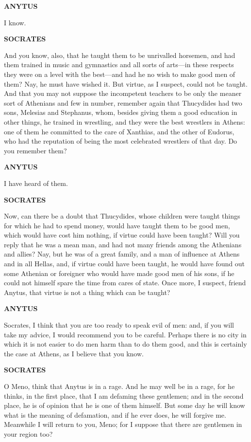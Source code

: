 \documentclass[11pt,letter]{article}
\begin{document}
\par \textbf{ANYTUS}
\par   I know.

\par \textbf{SOCRATES}
\par   And you know, also, that he taught them to be unrivalled horsemen, and had them trained in music and gymnastics and all sorts of arts—in these respects they were on a level with the best—and had he no wish to make good men of them? Nay, he must have wished it. But virtue, as I suspect, could not be taught. And that you may not suppose the incompetent teachers to be only the meaner sort of Athenians and few in number, remember again that Thucydides had two sons, Melesias and Stephanus, whom, besides giving them a good education in other things, he trained in wrestling, and they were the best wrestlers in Athens:  one of them he committed to the care of Xanthias, and the other of Eudorus, who had the reputation of being the most celebrated wrestlers of that day. Do you remember them?

\par \textbf{ANYTUS}
\par   I have heard of them.

\par \textbf{SOCRATES}
\par   Now, can there be a doubt that Thucydides, whose children were taught things for which he had to spend money, would have taught them to be good men, which would have cost him nothing, if virtue could have been taught? Will you reply that he was a mean man, and had not many friends among the Athenians and allies? Nay, but he was of a great family, and a man of influence at Athens and in all Hellas, and, if virtue could have been taught, he would have found out some Athenian or foreigner who would have made good men of his sons, if he could not himself spare the time from cares of state. Once more, I suspect, friend Anytus, that virtue is not a thing which can be taught?

\par \textbf{ANYTUS}
\par   Socrates, I think that you are too ready to speak evil of men:  and, if you will take my advice, I would recommend you to be careful. Perhaps there is no city in which it is not easier to do men harm than to do them good, and this is certainly the case at Athens, as I believe that you know.

\par \textbf{SOCRATES}
\par   O Meno, think that Anytus is in a rage. And he may well be in a rage, for he thinks, in the first place, that I am defaming these gentlemen; and in the second place, he is of opinion that he is one of them himself. But some day he will know what is the meaning of defamation, and if he ever does, he will forgive me. Meanwhile I will return to you, Meno; for I suppose that there are gentlemen in your region too?
\end{document}
